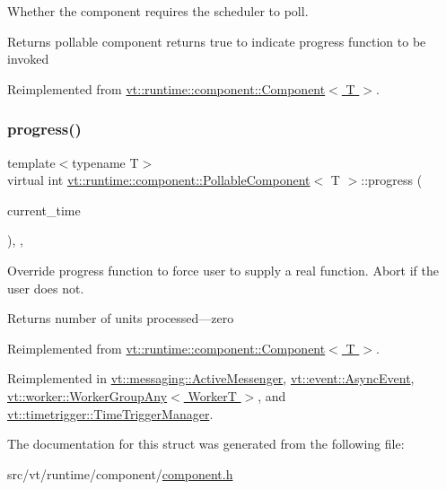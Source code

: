 Whether the component requires the scheduler to poll. 

\begin{DoxyReturn}{Returns}
pollable component returns true to indicate progress function to be invoked 
\end{DoxyReturn}


Reimplemented from \hyperlink{structvt_1_1runtime_1_1component_1_1_component_a5a15bd0369a9d3765a6c70249bada96f}{vt\+::runtime\+::component\+::\+Component$<$ T $>$}.

\mbox{\label{structvt_1_1runtime_1_1component_1_1_pollable_component_a51939e8b7e895a377c10c6767034396b}} 
\subsubsection{\texorpdfstring{progress()}{progress()}}
{\footnotesize\ttfamily template$<$typename T$>$ \\
virtual int \hyperlink{structvt_1_1runtime_1_1component_1_1_pollable_component}{vt\+::runtime\+::component\+::\+Pollable\+Component}$<$ T $>$\+::progress (\begin{DoxyParamCaption}\item[{\hyperlink{namespacevt_a876a9d0cd5a952859c72de8a46881442}{Time\+Type}}]{current\+\_\+time }\end{DoxyParamCaption})\hspace{0.3cm}{\ttfamily [inline]}, {\ttfamily [override]}, {\ttfamily [virtual]}}



Override progress function to force user to supply a real function. Abort if the user does not. 

\begin{DoxyReturn}{Returns}
number of units processed---zero 
\end{DoxyReturn}


Reimplemented from \hyperlink{structvt_1_1runtime_1_1component_1_1_component_a45e3c09608c2d8d1a7de12e1c3347f1e}{vt\+::runtime\+::component\+::\+Component$<$ T $>$}.



Reimplemented in \hyperlink{structvt_1_1messaging_1_1_active_messenger_a59eadf26776b0adcf46d22d7bddedf4c}{vt\+::messaging\+::\+Active\+Messenger}, \hyperlink{structvt_1_1event_1_1_async_event_aa99cf6ece5deebbe4f43c9d21a78a2aa}{vt\+::event\+::\+Async\+Event}, \hyperlink{structvt_1_1worker_1_1_worker_group_any_a9b71b3e44ee938d873adce83d51dee33}{vt\+::worker\+::\+Worker\+Group\+Any$<$ Worker\+T $>$}, and \hyperlink{structvt_1_1timetrigger_1_1_time_trigger_manager_a15cc796e1f07dbf32c04b3fb3f3ce06c}{vt\+::timetrigger\+::\+Time\+Trigger\+Manager}.



The documentation for this struct was generated from the following file\+:\begin{DoxyCompactItemize}
\item 
src/vt/runtime/component/\hyperlink{component_8h}{component.\+h}\end{DoxyCompactItemize}
